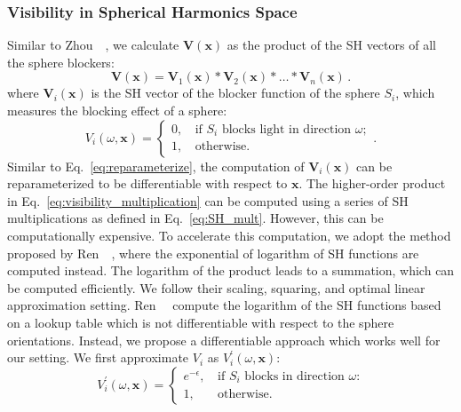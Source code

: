 \subsubsection{Visibility in Spherical Harmonics Space}
%
Similar to Zhou~\etal~\cite{zhou2005precomputed}, we calculate $\mathbf{V}(\mathbf{x})$ as the product of the SH vectors of all the sphere blockers:
%
%
\begin{equation}
\label{eq:visibility_multiplication}
\boldsymbol{V}(\mathbf{x})=\boldsymbol{V}_{1}(\mathbf{x}) * \boldsymbol{V}_{2} (\mathbf{x})* \ldots * \boldsymbol{V}_{n}(\mathbf{x}) \,.
\end{equation}
%
%
where $\boldsymbol{V}_{i}(\mathbf{x})$ is the SH vector of the blocker function of the sphere $S_{i}$, which measures the blocking effect of a sphere:
%
%
$$
V_{i}(\omega,\mathbf{x})=\left\{\begin{array}{ll}
0 \text {,} & \text{ if } S_i \text { blocks light in direction } \omega \text{;} \\
1 \text{,} & \text{ otherwise. }
\end{array}\right. \,.
$$
%
%
Similar to Eq.~\ref{eq:reparameterize}, the computation of $\boldsymbol{V}_i(\mathbf{x})$ can be reparameterized to be differentiable with respect to $\mathbf{x}$.
%
The higher-order product in Eq.~\ref{eq:visibility_multiplication} can be computed using a series of SH multiplications as defined in Eq.~\ref{eq:SH_mult}. 
%
However, this can be computationally expensive. 
%
To accelerate this computation, we adopt the method proposed by Ren~\etal~\cite{ren2006real}, where the exponential of logarithm of SH functions are computed instead. 
%
The logarithm of the product leads to a summation, which can be computed efficiently. 
%
We follow their scaling, squaring, and optimal linear approximation setting.
%
Ren~\etal~\cite{ren2006real} compute the logarithm of the SH functions based on a lookup table which is not differentiable with respect to the sphere orientations.
%
Instead, we propose a differentiable approach which works well for our setting. 
%
We first approximate $V_i$ as $V^{'}_{i}(\omega,\mathbf{x})$: 
%
%
\begin{equation}
V^{'}_{i}(\omega,\mathbf{x})=\left\{\begin{array}{ll}
e^{-\epsilon} \text {,} & \text{ if } S_i \text { blocks in direction } \omega \text{:} \\
1 \text {,} & \text{ otherwise. }
\end{array}\right. 
\end{equation}
